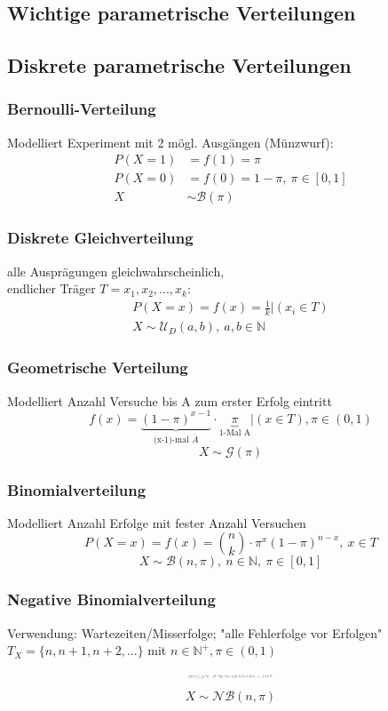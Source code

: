 \documentclass[10pt,a4paper,landscape]{article}
\begin{document}
\begin{multicols}{4}
\section{Wichtige parametrische Verteilungen}

\subsection{Diskrete parametrische Verteilungen}
\subsubsection{Bernoulli-Verteilung}
Modelliert Experiment mit 2 mögl. Ausgängen (Münzwurf):
\begin{align*}
P(X=1) &= f(1) = \pi \\
P(X=0) &= f(0) = 1 - \pi, ~\pi \in [0,1] \\
X &\sim \mathcal{B}(\pi)
\end{align*}

\subsubsection{Diskrete Gleichverteilung}
alle Ausprägungen gleichwahrscheinlich, \\
endlicher Träger $T={x_1, x_2, ..., x_k}$:
\begin{align*}
P(X=x) = f(x)=\frac{1}{k}|(x_i \in T) \\
X \sim \mathcal{U}_D(a,b), ~ a,b \in \mathbb{N}
\end{align*}

\subsubsection{Geometrische Verteilung}
Modelliert Anzahl Versuche bis A zum erster Erfolg eintritt
\[
f(x)= \underbrace{(1 - \pi)^{x-1}}_{\text{(x-1)-mal } \overline{A}}
 \cdot \underbrace{\pi}_{\text{1-Mal A}}|(x \in T), \pi \in (0,1)
\]
\[
X \sim \mathcal{G}(\pi)
\]

\subsubsection{Binomialverteilung}
Modelliert Anzahl Erfolge mit fester Anzahl Versuchen
\[
P(X=x)=f(x)=\binom{n}{k} \cdot \pi^x(1-\pi)^{n-x}, ~ x \in T 
\]
\[
X \sim \mathcal{B}(n, \pi), ~ n \in \mathbb{N}, ~\pi \in [0,1]
\]

\subsubsection{Negative Binomialverteilung}
Verwendung: Wartezeiten/Misserfolge; "alle Fehlerfolge vor Erfolgen" \\
$T_X=\{n, n+1, n+2, ...\}$ mit $n \in \mathbb{N}^+, \pi \in (0,1)$
\[\resizebox{0.2\textwidth}{!}{$
f(x)=\binom{x-1}{n-1}\pi ^n(1-\pi)^{x-n}|(x \geq n), \pi \in (0,1), T_X=\{n, n+1, ...\} ~ n \in \mathbb{N}^+
$}
\]
\[
X \sim \mathcal{NB}(n, \pi)
\]


\end{multicols}
\end{document}
